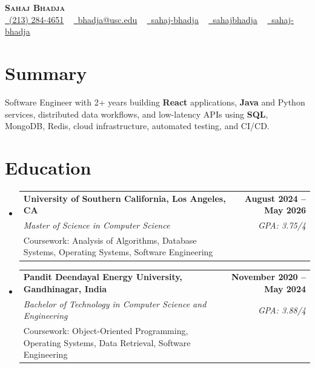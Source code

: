 \documentclass[letterpaper,10pt]{article}
\makeatletter
\newcommand{\sectionGap}{\vspace{-8pt}}
\newcommand{\resumeEduSubheading}[5]{\vspace{-1pt}\item\begin{tabular*}{1.0\textwidth}[t]{l@{\extracolsep{\fill}}r}\textbf{#1} & \textbf{\small #2} \\\textit{\small #3} & \textit{\small #4} \\\small #5 & \\\end{tabular*}\vspace{-4pt}}
\newcommand{\resumeSubHeadingListStart}{\begin{itemize}[leftmargin=0.0in, label={}]}
\newcommand{\resumeSubHeadingListEnd}{\end{itemize}}
\makeatother
\begin{document}
\begin{center}
{\Huge \scshape \textbf{Sahaj Bhadja}} \\ \vspace{1pt}
\small \href{tel:2132844651}{\faPhone\ \underline{(213) 284-4651}} ~ \href{mailto:bhadja@usc.edu}{\raisebox{-0.2\height}\faEnvelope\ \underline{bhadja@usc.edu}} ~
\href{https://www.linkedin.com/in/sahaj-bhadja/}{\raisebox{-0.2\height}\faLinkedin\ \underline{sahaj-bhadja}} ~ \href{https://github.com/SAHAJ-BHADJA}{\raisebox{-0.2\height}\faGithub\ \underline{sahajbhadja}} ~
\href{https://sahaj-bhadja.vercel.app/}{\raisebox{-0.2\height}\faGlobe\ \underline{sahaj-bhadja}}
\end{center}
\vspace{-16pt}
\section{Summary}
\begin{itemize}[leftmargin=0.15in, label={}]
\small{\item{Software Engineer with 2+ years building \textbf{React} applications, \textbf{Java} and Python services, distributed data workflows, and low-latency APIs using \textbf{SQL}, MongoDB, Redis, cloud infrastructure, automated testing, and CI/CD.}}
\end{itemize}
\sectionGap
\section{Education}
\resumeSubHeadingListStart
\resumeEduSubheading{University of Southern California, Los Angeles, CA}{August 2024 -- May 2026}{Master of Science in Computer Science}{GPA: 3.75/4}{Coursework: Analysis of Algorithms, Database Systems, Operating Systems, Software Engineering}
\resumeEduSubheading{Pandit Deendayal Energy University, Gandhinagar, India}{November 2020 -- May 2024}{Bachelor of Technology in Computer Science and Engineering}{GPA: 3.88/4}{Coursework: Object-Oriented Programming, Operating Systems, Data Retrieval, Software Engineering}
\resumeSubHeadingListEnd
\sectionGap
\end{document}
